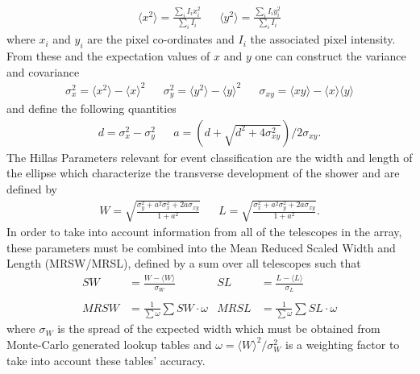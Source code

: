 \begin{align*}
\langle x^2 \rangle = \frac{\sum_i I_i x_i^2}{\sum_i I_i} && \langle y^2 \rangle = \frac{\sum_i I_i y_i^2}{\sum_i I_i}
\end{align*}
where $x_i$ and $y_i$ are the pixel co-ordinates and $I_i$ the associated pixel intensity. From these and the expectation values of $x$ and $y$ one can construct the variance and covariance
\begin{align*}
\sigma_x^2=\langle x^2 \rangle - \langle x \rangle^2&&\sigma_y^2=\langle y^2 \rangle - \langle y \rangle^2&&\sigma_{xy}=\langle xy \rangle - \langle x \rangle\langle y \rangle
\end{align*}
and define the following quantities
\begin{align*}
d=\sigma_x^2-\sigma_y^2&&a=(d+\sqrt{d^2+4\sigma_{xy}^2})/2\sigma_{xy}.
\end{align*}
The Hillas Parameters relevant for event classification are the width and length of the ellipse which characterize the transverse development of the shower and are defined by
\begin{align*}
W=\sqrt{\frac{\sigma_y^2+a^2\sigma_x^2+2a\sigma_{xy}}{1+a^2}}&&L=\sqrt{\frac{\sigma_x^2+a^2\sigma_y^2+2a\sigma_{xy}}{1+a^2}}.
\end{align*}
In order to take into account information from all of the telescopes in the array, these parameters must be combined into the Mean Reduced Scaled Width and Length (MRSW/MRSL), defined by a sum over all telescopes such that
\begin{align*}
SW&=\frac{W-\langle W \rangle}{\sigma_W}   &    SL&=\frac{L-\langle L \rangle}{\sigma_L}\\
\\ MRSW&=\frac{1}{\sum \omega}\sum SW\cdot \omega & MRSL&=\frac{1}{\sum \omega}\sum SL\cdot \omega
\end{align*}
where $\sigma_W$ is the spread of the expected width which must be obtained from Monte-Carlo generated lookup tables and $\omega=\langle W \rangle^2/\sigma_W^2$ is a weighting factor to take into account these tables' accuracy.

